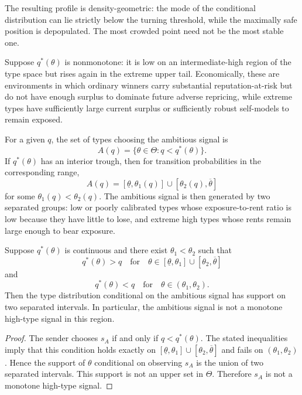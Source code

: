 The resulting profile is density-geometric: the mode of the conditional distribution can lie strictly below the turning threshold, while the maximally safe position is depopulated. The most crowded point need not be the most stable one.

Suppose \(q^*(\theta)\) is nonmonotone: it is low on an intermediate-high region of the type space but rises again in the extreme upper tail. Economically, these are environments in which ordinary winners carry substantial reputation-at-risk but do not have enough surplus to dominate future adverse repricing, while extreme types have sufficiently large current surplus or sufficiently robust self-models to remain exposed.

For a given \(q\), the set of types choosing the ambitious signal is
\[
A(q)=\{\theta\in\Theta:q<q^*(\theta)\}.
\]
If \(q^*(\theta)\) has an interior trough, then for transition probabilities in the corresponding range,
\[
A(q)=[\underline\theta,\theta_1(q)]\cup[\theta_2(q),\overline\theta]
\]
for some \(\theta_1(q)<\theta_2(q)\). The ambitious signal is then generated by two separated groups: low or poorly calibrated types whose exposure-to-rent ratio is low because they have little to lose, and extreme high types whose rents remain large enough to bear exposure.

\begin{proposition}
\label{prop:polarized-degradation}
Suppose \(q^*(\theta)\) is continuous and there exist \(\theta_1<\theta_2\) such that
\[
q^*(\theta)>q \quad\text{for}\quad \theta\in[\underline\theta,\theta_1]\cup[\theta_2,\overline\theta]
\]
and
\[
q^*(\theta)<q \quad\text{for}\quad \theta\in(\theta_1,\theta_2).
\]
Then the type distribution conditional on the ambitious signal has support on two separated intervals. In particular, the ambitious signal is not a monotone high-type signal in this region.
\end{proposition}

\begin{proof}
The sender chooses \(s_A\) if and only if \(q<q^*(\theta)\). The stated inequalities imply that this condition holds exactly on \([\underline\theta,\theta_1]\cup[\theta_2,\overline\theta]\) and fails on \((\theta_1,\theta_2)\). Hence the support of \(\theta\) conditional on observing \(s_A\) is the union of two separated intervals. This support is not an upper set in \(\Theta\). Therefore \(s_A\) is not a monotone high-type signal.
\end{proof}

